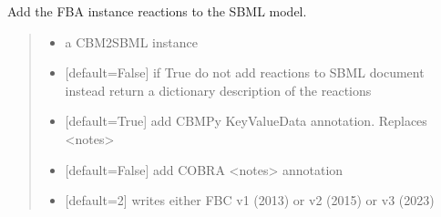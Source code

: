 \documentclass[letterpaper,12pt,english]{sphinxmanual}
\begin{document}

\begin{fulllineitems}
\label{\detokenize{api/io:cbmpy.CBXML.sbml_setReactionsL3Fbc}}
\pysigstartsignatures
\pysiglinewithargsret
{}
{\sphinxparamcomma {}\sphinxparamcomma {}\sphinxparamcomma {}\sphinxparamcomma {}}
{}
\pysigstopsignatures
\sphinxAtStartPar
Add the FBA instance reactions to the SBML model.
\begin{quote}\begin{description}
\begin{itemize}
\item {} 
\sphinxAtStartPar
{} \textendash{} a CBM2SBML instance

\item {} 
\sphinxAtStartPar
{} \textendash{} {[}default=False{]} if True do not add reactions to SBML document instead return a dictionary description of the reactions

\item {} 
\sphinxAtStartPar
{} \textendash{} {[}default=True{]} add CBMPy KeyValueData annotation. Replaces \textless{}notes\textgreater{}

\item {} 
\sphinxAtStartPar
{} \textendash{} {[}default=False{]} add COBRA \textless{}notes\textgreater{} annotation

\item {} 
\sphinxAtStartPar
{} \textendash{} {[}default=2{]} writes either FBC v1 (2013) or v2 (2015) or v3 (2023)

\end{itemize}

\end{description}\end{quote}

\end{fulllineitems}
\end{document}

